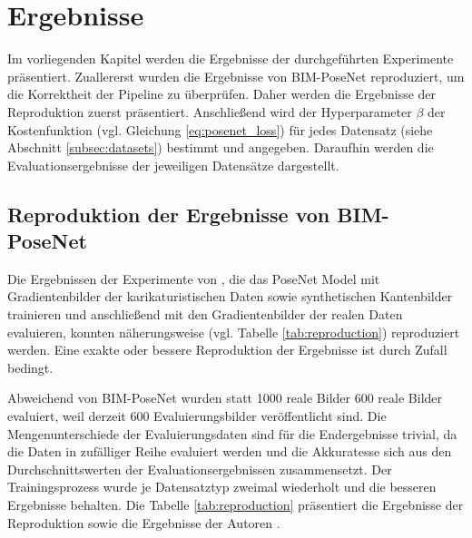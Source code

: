 
\section{Ergebnisse}
Im vorliegenden Kapitel werden die Ergebnisse der durchgeführten Experimente präsentiert. Zuallererst wurden die Ergebnisse von BIM-PoseNet \cite{acharyaBIMPoseNetIndoorCamera2019} reproduziert, um die Korrektheit der Pipeline zu überprüfen. Daher werden die Ergebnisse der Reproduktion zuerst präsentiert. Anschließend wird der Hyperparameter $\beta$ der Kostenfunktion (vgl. Gleichung \ref{eq:posenet_loss}) für jedes Datensatz (siehe Abschnitt \ref{subsec:datasets}) bestimmt und angegeben. Daraufhin werden die Evaluationsergebnisse der jeweiligen Datensätze dargestellt.
\subsection{Reproduktion der Ergebnisse von BIM-PoseNet}
Die Ergebnissen der Experimente von \citet{acharyaBIMPoseNetIndoorCamera2019}, die das PoseNet Model mit Gradientenbilder der karikaturistischen Daten sowie synthetischen Kantenbilder trainieren und anschließend mit den Gradientenbilder der realen Daten evaluieren, konnten näherungsweise (vgl. Tabelle \ref{tab:reproduction}) reproduziert werden. Eine exakte oder bessere Reproduktion der Ergebnisse ist durch Zufall bedingt.

Abweichend von BIM-PoseNet wurden statt 1000 reale Bilder 600 reale Bilder evaluiert, weil derzeit 600 Evaluierungsbilder veröffentlicht sind. Die Mengenunterschiede der Evaluierungsdaten sind für die Endergebnisse trivial, da die Daten in zufälliger Reihe evaluiert werden und die Akkuratesse sich aus den Durchschnittswerten der Evaluationsergebnissen zusammensetzt. Der Trainingsprozess wurde je Datensatztyp zweimal wiederholt und die besseren Ergebnisse behalten. Die Tabelle \ref{tab:reproduction} präsentiert die Ergebnisse der Reproduktion sowie die Ergebnisse der Autoren \citet{acharyaBIMPoseNetIndoorCamera2019}.



